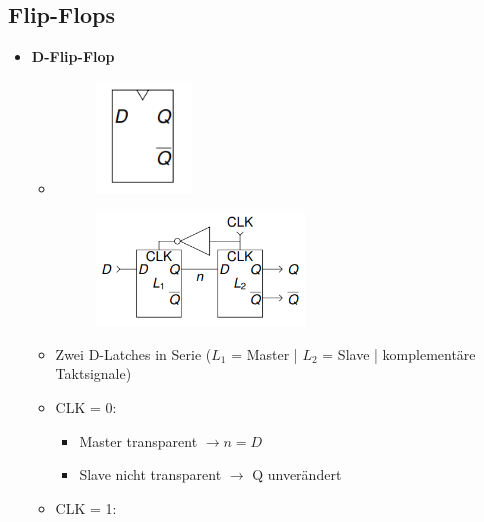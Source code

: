 \documentclass[11pt,a4paper]{article}
\begin{document}
\subsection{Flip-Flops}
\begin{itemize}

\item \textbf{D-Flip-Flop}
	\begin{itemize}
	\item[]		
				\begin{minipage}{0.25\textwidth}
					\begin{figure}[H]
					\includegraphics[height=3cm]{dflipflop1}
					\end{figure}
				\end{minipage}
				\begin{minipage}[t]{0.6\textwidth}
					\vspace{-2.25cm}
					\begin{figure}[H]
					\includegraphics[height=3cm]{dflipflop2}
					\end{figure}
				\end{minipage}
	\end{itemize}
	\begin{itemize}
	\item Zwei D-Latches in Serie ($L_1$ = Master | $L_2$ = Slave | komplementäre Taktsignale)
 	\item CLK = 0:
 		\vspace{-0.3cm}
 		\begin{itemize}
 		\item Master transparent $\rightarrow n = D$
 		\item Slave nicht transparent $\rightarrow$ Q unverändert
 		\end{itemize}
 	\item CLK = 1:
 		\vspace{-0.3cm}
 		\begin{itemize}

\end{itemize}
\end{itemize}
\end{itemize}
\end{document}
